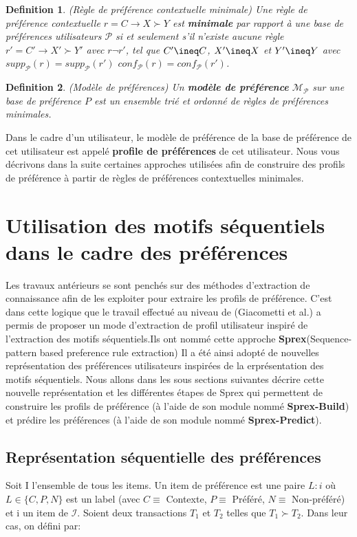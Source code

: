 \documentclass[a4paper,12pt,openany,oneside]{article}
\newtheorem{defn}{Definition} %
\begin{document}
\begin{defn}(Règle de préférence contextuelle minimale)
Une règle de préférence contextuelle $r=C\rightarrow X\succ Y$ est \textbf{minimale} par rapport à une base de préférences utilisateurs $\mathcal{P}$ si et seulement s'il n'existe aucune règle $r'=C'\rightarrow X'\succ Y'$ avec $r\neg r'$, tel que $C'\ineq C$, $X'\ineq X$ et $Y'\ineq Y$ avec $supp_\mathcal{P}(r)=supp_\mathcal{P}(r')$ $conf_\mathcal{P}(r)=conf_\mathcal{P}(r')$.
\end{defn}

\begin{defn}(Modèle de préférences)
Un \textbf{modèle de préférence} $\mathcal{M}_\mathcal{P}$ sur une base de préférence $P$ est un ensemble trié et ordonné de règles de préférences minimales.
\end{defn}
Dans le cadre d'un utilisateur, le modèle de préférence de la base de préférence de cet utilisateur est appelé \textbf{profile de préférences} de cet utilisateur.
Nous vous décrivons dans la suite certaines approches utilisées afin de construire des profils de préférence à partir de règles de préférences contextuelles minimales.



\section{Utilisation des motifs séquentiels dans le cadre des préférences}

Les travaux antérieurs se sont penchés sur des méthodes d'extraction de connaissance afin de les exploiter pour extraire les profils de préférence.
C'est dans cette logique que le travail effectué au niveau de (Giacometti et al.) a permis de proposer un mode d'extraction de profil utilisateur inspiré de l'extraction des motifs séquentiels.Ils ont nommé cette approche \textbf{Sprex}(Sequence-pattern based preference rule extraction)
Il a été ainsi adopté de nouvelles représentation des préférences utilisateurs inspirées de la erprésentation des motifs séquentiels.
Nous allons dans les sous sections suivantes décrire cette nouvelle représentation et les différentes étapes de Sprex qui permettent de construire les profils de préférence (à l'aide de son module nommé \textbf{Sprex-Build}) et prédire les préférences (à l'aide de son module nommé \textbf{Sprex-Predict}). 

\subsection{Représentation séquentielle des préférences}
Soit I l'ensemble de tous les items. Un item de préférence est une paire $L:i$ où $L\in \{C,P,N\}$ est un label (avec $C\equiv $ Contexte, $P\equiv $ Préféré, $N\equiv $ Non-préféré) et i un item de $\mathcal{I}$.
Soient deux transactions $T_1$ et $T_2$ telles que $T_1\succ T_2$. Dans leur cas, on défini par:
\end{document}
